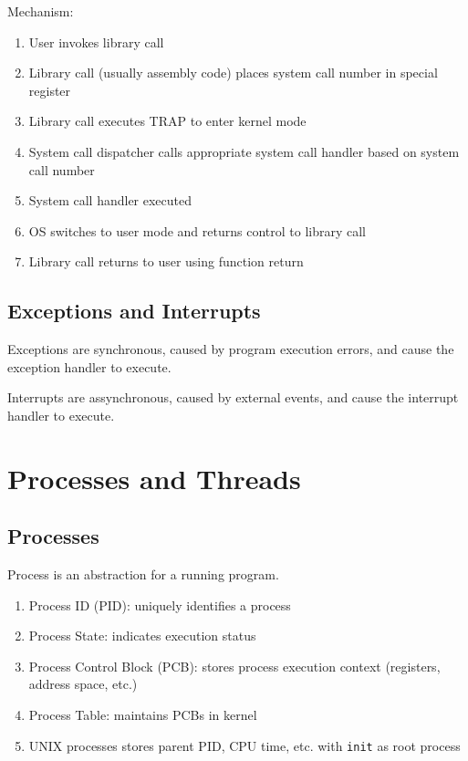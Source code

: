 \documentclass[12pt, a4paper]{article}
\begin{document}
\begin{multicols*}{3}
Mechanism:
\begin{enumerate}[\roman*.]
  \item User invokes library call 
  \item Library call (usually assembly code) places system call number in special register 
  \item Library call executes TRAP to enter kernel mode 
  \item System call dispatcher calls appropriate system call handler based on system call number 
  \item System call handler executed 
  \item OS switches to user mode and returns control to library call
  \item Library call returns to user using function return
\end{enumerate}

\subsection{Exceptions and Interrupts}
Exceptions are synchronous, caused by program execution errors, and cause the exception handler to execute.

Interrupts are assynchronous, caused by external events, and cause the interrupt handler to execute.

\colbreak
\section{Processes and Threads}
\subsection{Processes}
Process is an abstraction for a running program.\\
\begin{enumerate}[\roman*.]
  \item Process ID (PID): uniquely identifies a process 
  \item Process State: indicates execution status
  \item Process Control Block (PCB): stores process execution context (registers, address space, etc.)
  \item Process Table: maintains PCBs in kernel
  \item UNIX processes stores parent PID, CPU time, etc. with \lstinline|init| as root process
\end{enumerate}
{\centering
  \\
  \vspace{1em}
\par}


\end{multicols*}
\end{document}
